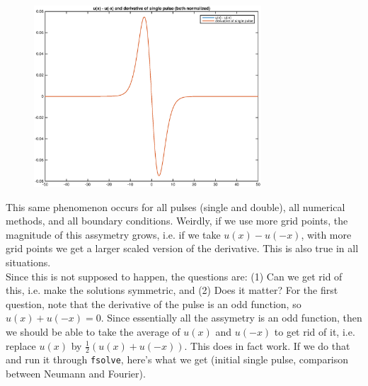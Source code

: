 \documentclass[12pt]{article}
\begin{document}
\begin{figure}[H]
\includegraphics[width=8.5cm]{0singleflipdiffandderivneumann}
\end{figure}

This same phenomenon occurs for all pulses (single and double), all numerical methods, and all boundary conditions. Weirdly, if we use more grid points, the magnitude of this assymetry grows, i.e. if we take $u(x) - u(-x)$, with more grid points we get a larger scaled version of the derivative. This is also true in all situations. \\

Since this is not supposed to happen, the questions are: (1) Can we get rid of this, i.e. make the solutions symmetric, and (2) Does it matter? For the first question, note that the derivative of the pulse is an odd function, so $u(x) + u(-x) = 0$. Since essentially all the assymetry is an odd function, then we should be able to take the average of $u(x)$ and $u(-x)$ to get rid of it, i.e. replace $u(x)$ by $\frac{1}{2}(u(x) + u(-x))$. This does in fact work. If we do that and run it through \texttt{fsolve}, here's what we get (initial single pulse, comparison between Neumann and Fourier).
\end{document}

